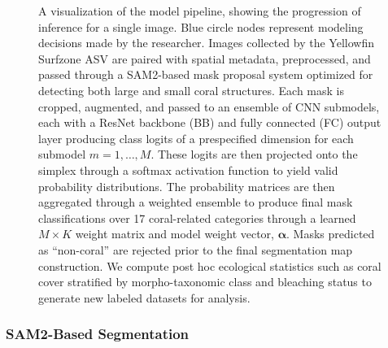 \documentclass[11pt]{elsarticle}
\begin{document}
\begin{figure}
    \centering
    \resizebox{0.9\textheight}{!}{%
        
    }
    \caption{A visualization of the model pipeline, showing the progression of inference for a single image. Blue circle nodes represent modeling decisions made by the researcher. Images collected by the Yellowfin Surfzone ASV are paired with spatial metadata, preprocessed, and passed through a SAM2-based mask proposal system optimized for detecting both large and small coral structures. Each mask is cropped, augmented, and passed to an ensemble of CNN submodels, each with a ResNet backbone (BB) and fully connected (FC) output layer producing class logits of a prespecified dimension for each submodel $m=1,\ldots,M$. These logits are then projected onto the simplex through a softmax activation function to yield valid probability distributions. The probability matrices are then aggregated through a weighted ensemble to produce final mask classifications over 17 coral-related categories through a learned $M\times K$ weight matrix and model weight vector, $\bm{\alpha}$. Masks predicted as ``non-coral'' are rejected prior to the final segmentation map construction. We compute post hoc ecological statistics such as coral cover stratified by morpho-taxonomic class and bleaching status to generate new labeled datasets for analysis.}
    \label{fig:pipeline}
\end{figure}

\subsubsection{SAM2-Based Segmentation}
\label{sec:sam2}
\end{document}
